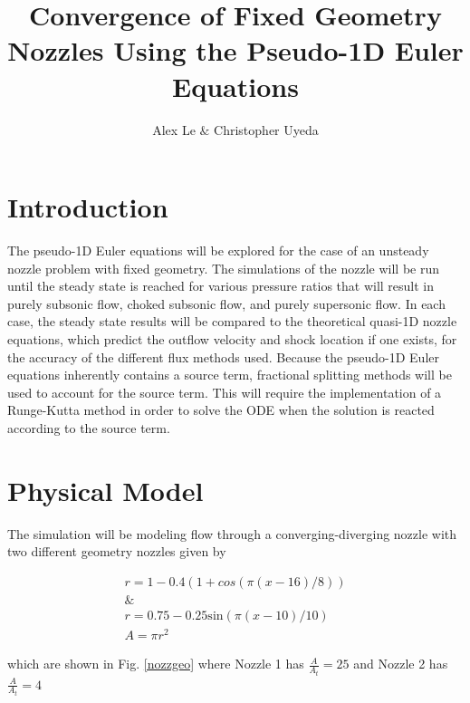 \documentclass{article}%
\title{Convergence of Fixed Geometry Nozzles Using the Pseudo-1D Euler Equations}
\author{Alex Le $\&$ Christopher Uyeda}
\numberwithin{equation}{section}
\begin{document}
\maketitle

\section{Introduction}
The pseudo-1D Euler equations will be explored for the case of an unsteady nozzle problem with fixed geometry. The simulations of the nozzle will be run until the steady state is reached for various pressure ratios that will result in purely subsonic flow, choked subsonic flow, and purely supersonic flow. In each case, the steady state results will be compared to the theoretical quasi-1D nozzle equations, which predict the outflow velocity and shock location if one exists, for the accuracy of the different flux methods used. Because the pseudo-1D Euler equations inherently contains a source term, fractional splitting methods will be used to account for the source term. This will require the implementation of a Runge-Kutta method in order to solve the ODE when the solution is reacted according to the source term.


\section{Physical Model}
The simulation will be modeling flow through a converging-diverging nozzle with two different geometry nozzles given by

\begin{equation}
\begin{split}
r = 1-0.4(1 + cos(\pi(x -16)/8))   \\
\& \\
r = 0.75 - 0.25 \text{sin}(\pi(x - 10)/10)  \\
A = \pi r^2
\end{split}
\end{equation}

which are shown in Fig. \ref{nozzgeo} where Nozzle 1 has $\frac{A}{A_t} = 25$ and Nozzle 2 has $\frac{A}{A_t} = 4$
\end{document}

